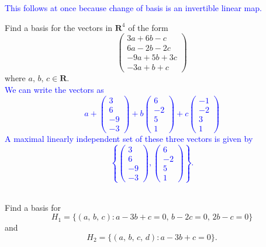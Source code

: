 \documentclass[a4paper,11pt]{article}
\newcommand{\R}{\mathbf{R}}
\newcommand{\blue}[1]{\textcolor{blue}{#1}}
\begin{document}
\blue{This follows at once because change of basis is an invertible linear map.
  \\}

 Find a basis for the vectors in $\R^4$ of the form
\[
  \left(
    \begin{array}{c}
      3a+6b-c \\
      6a-2b-2c \\
      -9a+5b+3c \\
      -3a+b+c
    \end{array}
  \right)
\]
where $a,\,b,\,c \in \R$. \\

\blue{We can write the vectors as
  \[
    a+
    \left(
      \begin{array}{r}
        3 \\ 6 \\ -9 \\ -3
      \end{array}
    \right)
    +b
    \left(
      \begin{array}{r}
        6 \\ -2 \\ 5 \\ 1
      \end{array}
    \right)
    +c
    \left(
      \begin{array}{r}
        -1 \\ -2 \\ 3 \\ 1
      \end{array}
    \right)
  \]
  A maximal linearly independent set of these three vectors is given by
  \[
    \left\{
      \left(
        \begin{array}{r}
          3 \\ 6 \\ -9 \\ -3
        \end{array}
      \right),
      \left(
        \begin{array}{r}
          6 \\ -2 \\ 5 \\ 1
        \end{array}
      \right)
    \right\}.
  \] \\}

 Find a basis for
\[
  H_1 = \{(a,\,b,\,c) : a-3b+c=0,\,b-2c=0,\,2b-c=0\}
\]
and
\[
  H_2 = \{(a,\,b,\,c,\,d) : a-3b+c=0\}.
\] \\
\end{document}
